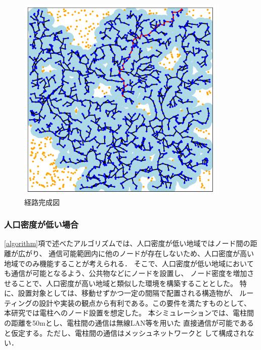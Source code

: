 \documentclass[a4paper, 11pt]{ltjsarticle}
\begin{document}
\begin{enumerate}[label=\textbf{(\arabic*)}]
        \begin{figure}[h]
          \centering
          \includegraphics[width=100mm]{4_step.png}
          \caption{経路完成図}
          \label{figure:fourth_step}
        \end{figure}

\end{enumerate}

\subsubsection{人口密度が低い場合}
\ref{algorithm}項で述べたアルゴリズムでは、人口密度が低い地域ではノード間の距離が広がり、
通信可能範囲内に他のノードが存在しないため、人口密度が高い地域でのみ機能することが考えられる．
そこで、人口密度が低い地域においても通信が可能となるよう、公共物などにノードを設置し、
ノード密度を増加させることで、人口密度が高い地域と類似した環境を構築することとした。
特に、設置対象としては、移動せずかつ一定の間隔で配置される構造物が、
ルーティングの設計や実装の観点から有利である。この要件を満たすものとして、
本研究では電柱へのノード設置を想定した。
本シミュレーションでは、電柱間の距離を50mとし\cite{電柱設置間隔}、電柱間の通信は無線LAN等を用いた
直接通信が可能であると仮定する。ただし、電柱間の通信はメッシュネットワークと
して構成されない．
\end{document}
